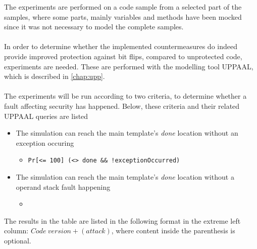 The experiments are performed on a code sample from a selected part of the \jc samples, where some parts, mainly variables and methods have been mocked since it was not necessary to model the complete samples.\\\\
In order to determine whether the implemented countermeasures do indeed provide improved protection against bit flips, compared to unprotected code, experiments are needed. These are performed with the modelling tool UPPAAL, which is described in \cref{chap:upp}.\\\\
The experiments will be run according to two criteria, to determine whether a fault affecting security has happened. Below, these criteria and their related UPPAAL queries are listed

\begin{itemize}
\item The simulation can reach the main template's \textit{done} location without an exception occuring
	\begin{itemize}
	\item \texttt{Pr[<= 100] (<> done \&\& !exceptionOccurred)}
	\end{itemize}
\item The simulation can reach the main template's \textit{done} location without a operand stack fault happening
	\begin{itemize}
	\item
	\end{itemize}
\end{itemize}

The results in the table are listed in the following format in the extreme left column: $Code\:version + (attack)$, where content inside the parenthesis is optional.





